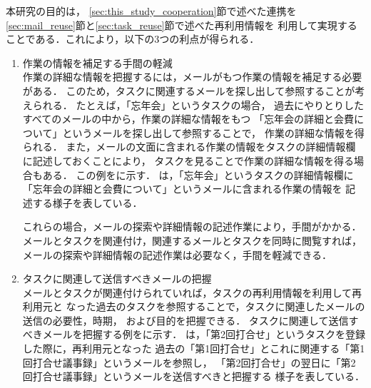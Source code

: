 \documentclass[submit,techreq,noauthor,dvipdfmx]{ipsj}
\begin{document}

本研究の目的は，
\ref{sec:this_study_cooperation}節で述べた連携を
\ref{sec:mail_reuse}節と\ref{sec:task_reuse}節で述べた再利用情報を
利用して実現することである．これにより，以下の3つの利点が得られる．
\begin{enumerate}

\item 作業の情報を補足する手間の軽減\\
作業の詳細な情報を把握するには，メールがもつ作業の情報を補足する必要がある．
このため，タスクに関連するメールを探し出して参照することが考えられる．
たとえば，「忘年会」というタスクの場合，
過去にやりとりしたすべてのメールの中から，作業の詳細な情報をもつ
「忘年会の詳細と会費について」というメールを探し出して参照することで，
作業の詳細な情報を得られる．
また，メールの文面に含まれる作業の情報をタスクの詳細情報欄に記述しておくことにより，
タスクを見ることで作業の詳細な情報を得る場合もある．
この例をに示す．
は，「忘年会」というタスクの詳細情報欄に
「忘年会の詳細と会費について」というメールに含まれる作業の情報を
記述する様子を表している．

これらの場合，メールの探索や詳細情報の記述作業により，手間がかかる．
メールとタスクを関連付け，関連するメールとタスクを同時に閲覧すれば，
メールの探索や詳細情報の記述作業は必要なく，手間を軽減できる．



\item タスクに関連して送信すべきメールの把握\\
  メールとタスクが関連付けられていれば，タスクの再利用情報を利用して再利用元と
  なった過去のタスクを参照することで，タスクに関連したメールの送信の必要性，時期，
  および目的を把握できる．
  タスクに関連して送信すべきメールを把握する例をに示す．
  は，「第2回打合せ」というタスクを登録した際に，再利用元となった
  過去の「第1回打合せ」とこれに関連する「第1回打合せ議事録」というメールを参照し，
  「第2回打合せ」の翌日に「第2回打合せ議事録」というメールを送信すべきと把握する
  様子を表している．




\end{enumerate}
\end{document}
